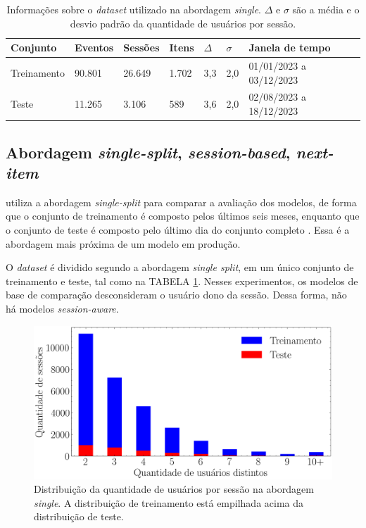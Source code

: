 \begin{table}
  \centering
  \begin{tabular}{|l|l|l|l|l|l|l|}
    \hline
    Conjunto & Eventos & Sessões & Itens & $\Delta$ & $\sigma$ & Janela de tempo \\ \hline 
       Treinamento & 90.801 & 26.649 & 1.702 & 3,3 & 2,0 & 01/01/2023 a 03/12/2023 \\ \hline
      Teste & 11.265 & 3.106 & 589 & 3,6 & 2,0 & 02/08/2023 a 18/12/2023 \\ \hline
  \end{tabular}
  \caption{Informações sobre o \textit{dataset} utilizado na abordagem
  \textit{single}. $\Delta$ e $\sigma$ são a média e o desvio padrão da quantidade de
  usuários por sessão.}
  \label{tab:split_data}
\end{table}
\subsection{Abordagem \textit{single-split}, \textit{session-based}, \textit{next-item}}

\citet{HidasiKBT15} utiliza a abordagem \textit{single-split} para comparar a
avaliação dos modelos, de forma que o conjunto de treinamento é composto pelos
últimos seis meses, enquanto que o conjunto de teste é composto pelo último dia
do conjunto completo \cite{ludewig_2018}. Essa é a abordagem mais próxima de um
modelo em produção.

O \textit{dataset} é dividido segundo a abordagem \textit{single split}, em um
único conjunto de treinamento e teste, tal como na TABELA
\ref{tab:split_data}. Nesses experimentos, os modelos de base de comparação
desconsideram o usuário dono da sessão. Dessa forma, não há modelos
\textit{session-aware}.

\begin{figure}[ht]
  \centering
  \includegraphics[width=1\textwidth]{chapters/chap04/images/histograma.png}
  \caption{Distribuição da quantidade de usuários por sessão na abordagem
  \textit{single}. A distribuição de treinamento está empilhada acima da
  distribuição de teste.}
  \label{fig:next-item-single}
\end{figure}

